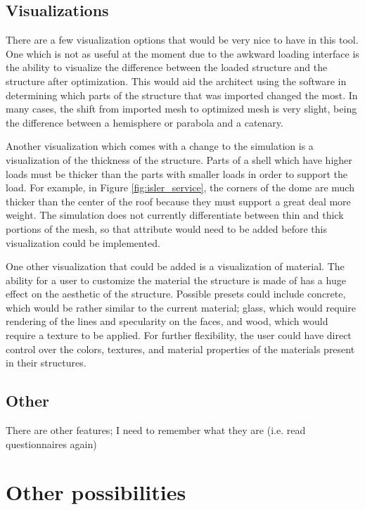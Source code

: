 \documentclass{thesis}
\begin{document}
\subsection{Visualizations}
There are a few visualization options that would be very nice to have in this tool.  One which is not as useful at the moment due
to the awkward loading interface is the ability to visualize the difference between the loaded structure and the structure after
optimization.  This would aid the architect using the software in determining which parts of the structure that was imported
changed the most.  In many cases, the shift from imported mesh to optimized mesh is very slight, being the difference between
a hemisphere or parabola and a catenary.

Another visualization which comes with a change to the simulation is a visualization of the thickness of the structure.  Parts
of a shell which have higher loads must be thicker than the parts with smaller loads in order to support the load.  For example,
in Figure \ref{fig:isler_service}, the corners of the dome are much thicker than the center of the roof because they must support
a great deal more weight.  The simulation does not currently differentiate between thin and thick portions of the mesh, so that
attribute would need to be added before this visualization could be implemented.

One other visualization that could be added is a visualization of material.  The ability for a user to customize the material the
structure is made of has a huge effect on the aesthetic of the structure.  Possible presets could include concrete, which would be
rather similar to the current material; glass, which would require rendering of the lines and specularity on the faces, and wood,
which would require a texture to be applied.  For further flexibility, the user could have direct control over the colors, textures,
and material properties of the materials present in their structures.

\subsection{Other}
There are other features; I need to remember what they are (i.e. read questionnaires again)

\section{Other possibilities}
\end{document}
